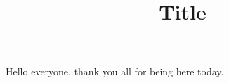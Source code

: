 \documentclass[12pt,letterpaper]{article}
\title{Title}
\date{}
\begin{document}
\maketitle

\slidenote{}
Hello everyone, thank you all for being here today.

\lipsum[1]
\end{document}
